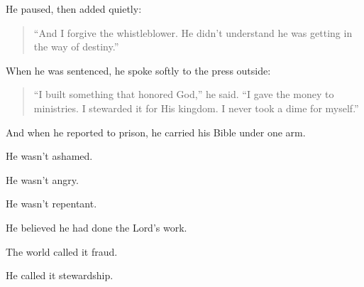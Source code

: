 He paused, then added quietly:

\begin{quote}
“And I forgive the whistleblower.  
He didn’t understand he was getting in the way of destiny.”
\end{quote}

When he was sentenced, he spoke softly to the press outside:

\begin{quote}
“I built something that honored God,” he said.  
“I gave the money to ministries.  
I stewarded it for His kingdom.  
I never took a dime for myself.”
\end{quote}

And when he reported to prison, he carried his Bible under one arm.

He wasn’t ashamed.

He wasn’t angry.

He wasn’t repentant.

He believed he had done the Lord’s work.

The world called it fraud.

He called it stewardship.

\medskip

